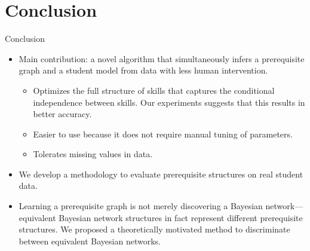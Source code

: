 \documentclass[hyperref={pdfpagelabels=false}]{beamer}
\begin{document}
\section{Conclusion}
\begin{frame}{Conclusion}
\begin{itemize}
	\item Main contribution: a novel algorithm that simultaneously infers \alert{a prerequisite graph} and \alert{a student model} from data with less human intervention.
	\begin{itemize}
		\item Optimizes the full structure of skills that captures the \alert{conditional independence} between skills. Our experiments suggests that this results in better accuracy.
		\item Easier to use because it does not require  manual tuning of  parameters.
		\item Tolerates missing values in data.
	\end{itemize}
	\item We develop a methodology to evaluate  prerequisite structures on real student data.
	\item Learning a prerequisite graph is not merely discovering a Bayesian network--- 
	\alert{equivalent Bayesian network structures} in fact represent different prerequisite structures.
	We proposed a theoretically motivated method to discriminate between equivalent Bayesian networks.
\end{itemize}
\end{frame}


\end{document}

